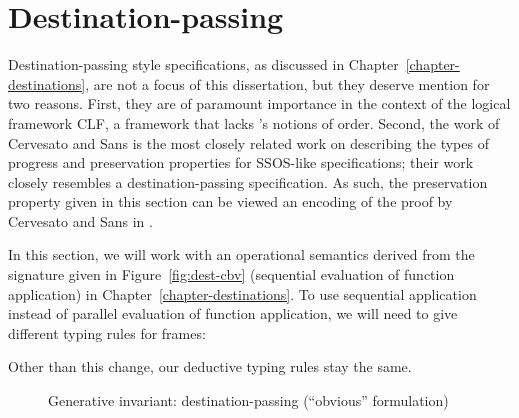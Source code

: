\section{Destination-passing}
\label{sec:gen-destinations}

Destination-passing style specifications, as discussed in
Chapter~\ref{chapter-destinations}, are not a focus of this
dissertation, but they deserve mention for two reasons. First, they
are of paramount importance in the context of the logical framework
CLF, a framework that lacks \sls's notions of order. Second, the work
of Cervesato and Sans \cite{cervesato13substructural} is the most
closely related work on describing the types of progress and
preservation properties for SSOS-like specifications; their work
closely resembles a destination-passing specification. As such, the
preservation property given in this section can be viewed an encoding
of the proof by Cervesato and Sans in \sls.

In this section, we will work with an
operational semantics derived from the signature given in
Figure~\ref{fig:dest-cbv} (sequential evaluation of function
application) in Chapter~\ref{chapter-destinations}. To use sequential
application instead of parallel evaluation of function application, we
will need to give different typing rules for frames:

\smallskip
{}
\smallskip

\noindent
Other than this change, our deductive typing rules stay the same.


\begin{figure}[tp]
\caption{Generative invariant: destination-passing (``obvious'' formulation)}
\label{fig:gen-destinations2} 
\end{figure}

